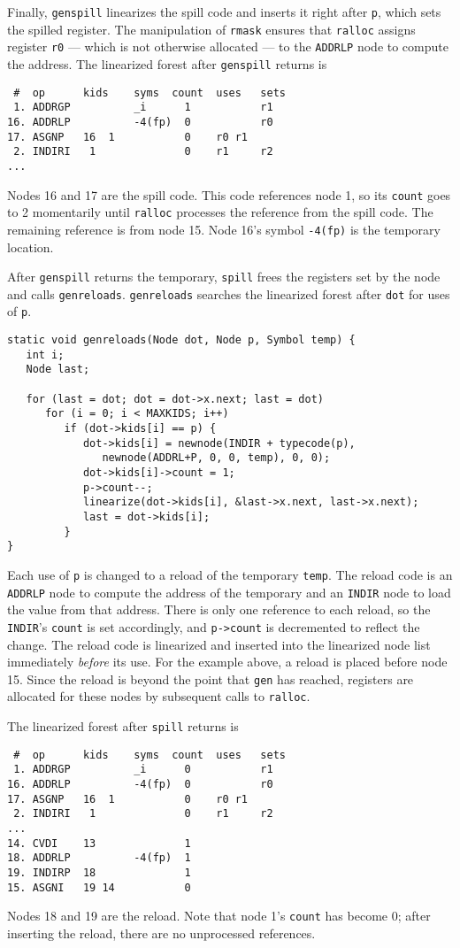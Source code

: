 Finally, \verb|genspill| linearizes the spill code and
inserts it right after \verb|p|, which sets the spilled register.
The manipulation of \verb|rmask| ensures that \verb|ralloc|
assigns register \verb|r0| --- which is not otherwise allocated ---
to the \verb|ADDRLP| node to compute the address.
The linearized forest after \verb|genspill| returns is
\begin{verbatim}
 #  op      kids    syms  count  uses   sets
 1. ADDRGP          _i      1           r1
16. ADDRLP          -4(fp)  0           r0
17. ASGNP   16  1           0    r0 r1        
 2. INDIRI   1              0    r1     r2
...     
\end{verbatim}
Nodes 16 and 17 are the spill code. This code references
node 1, so its \verb|count| goes to 2 momentarily
until \verb|ralloc| processes the reference from the spill code.
The remaining reference is from node 15.
Node 16's symbol \verb|-4(fp)| is the temporary location.

After \verb|genspill| returns the temporary,
\verb|spill| frees the registers set by the node and calls \verb|genreloads|.
\verb|genreloads| searches the linearized forest
after \verb|dot| for uses of \verb|p|.
\begin{verbatim}
static void genreloads(Node dot, Node p, Symbol temp) {
   int i;
   Node last;

   for (last = dot; dot = dot->x.next; last = dot)
      for (i = 0; i < MAXKIDS; i++)
         if (dot->kids[i] == p) {
            dot->kids[i] = newnode(INDIR + typecode(p),
               newnode(ADDRL+P, 0, 0, temp), 0, 0);
            dot->kids[i]->count = 1;
            p->count--;
            linearize(dot->kids[i], &last->x.next, last->x.next);
            last = dot->kids[i];
         }
}
\end{verbatim}
Each use of \verb|p| is changed
to a reload of the temporary \verb|temp|.
The reload code is an \verb|ADDRLP| node to compute the
address of the temporary and an \verb|INDIR| node to load the value
from that address. There is only one reference to each reload, so the
\verb|INDIR|'s \verb|count| is set accordingly,
and \verb|p->count| is decremented to reflect the change.
The reload code is linearized and inserted into the linearized node
list immediately {\em before} its use.
For the example above, a reload is placed before node 15.
Since the reload is beyond the point that \verb|gen| has reached,
registers are allocated for these nodes by subsequent calls to \verb|ralloc|.

The linearized forest after \verb|spill| returns is
\begin{verbatim}
 #  op      kids    syms  count  uses   sets
 1. ADDRGP          _i      0           r1
16. ADDRLP          -4(fp)  0           r0
17. ASGNP   16  1           0    r0 r1        
 2. INDIRI   1              0    r1     r2
...
14. CVDI    13              1                 
18. ADDRLP          -4(fp)  1                 
19. INDIRP  18              1                 
15. ASGNI   19 14           0                 
\end{verbatim}
Nodes 18 and 19 are the reload.
Note that node 1's \verb|count| has become 0;
after inserting the reload, there are no unprocessed references.

